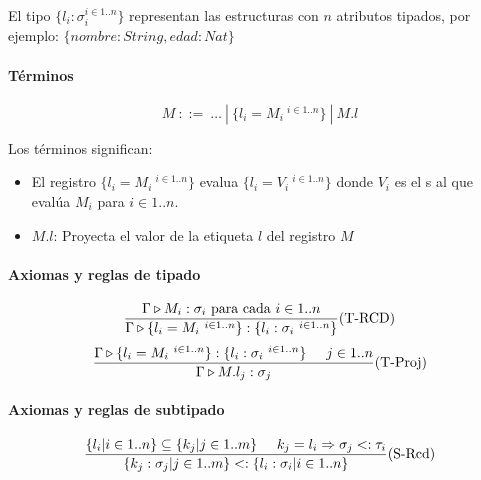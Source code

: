 El tipo $\{l_i : \sigma_i^{i\in 1..n}\}$ representan las estructuras con $n$ atributos tipados, por ejemplo: $\{nombre : String,edad:Nat\}$
\paragraph{Términos}
$$ M~::=~ \dots~|~\{l_i = M_i ~^{i\in 1..n}\}~|~M.l $$

Los términos significan:
\begin{itemize}
	\item El registro $\{l_i = M_i ~^{i\in 1..n}\}$ evalua $\{l_i = V_i ~^{i\in 1..n}\}$  donde $V_i$ es el s al que evalúa $M_i$ para $i\in 1..n$.
	\item $M.l$: Proyecta el valor de la etiqueta $l$ del registro $M$
\end{itemize}

\paragraph{Axiomas y reglas de tipado}
\begin{equation*}
	\frac{\Gamma\triangleright M_i : \sigma_i \text{ para cada } i \in 1..n}{\Gamma\triangleright \{l_i = M_i ~^{i\in 1..n}\} : \{l_i : \sigma_i ~^{i\in 1..n}\}}(\text{T-RCD})
\end{equation*}
\vspace*{5mm}
\begin{equation*}
	\frac{\Gamma\triangleright \{l_i = M_i ~^{i\in 1..n}\} : \{l_i : \sigma_i ~^{i\in 1..n}\}\hspace*{5mm} j \in 1..n}
	{\Gamma\triangleright M.l_j : \sigma_j}(\text{T-Proj})
\end{equation*}

\paragraph{Axiomas y reglas de subtipado}
%

\begin{equation*}
	\frac{\{l_i| i\in 1..n\}\subseteq\{k_j|j\in 1..m\} \hspace*{5mm} k_j = l_i\Rightarrow \sigma_j <: \tau_i}{\{k_j:\sigma_j|j\in 1..m\} <: \{l_i:\sigma_i| i\in 1..n\}}(\text{S-Rcd})
\end{equation*}

